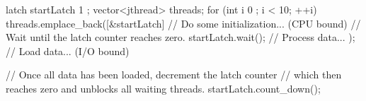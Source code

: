\begin{cpp}
latch startLatch { 1 };
vector<jthread> threads;
for (int i { 0 }; i < 10; ++i) {
  threads.emplace_back([&startLatch] {
     // Do some initialization... (CPU bound)
     // Wait until the latch counter reaches zero.
     startLatch.wait();
     // Process data...
  });
}
// Load data... (I/O bound)

// Once all data has been loaded, decrement the latch counter
// which then reaches zero and unblocks all waiting threads.
startLatch.count_down();
\end{cpp}























